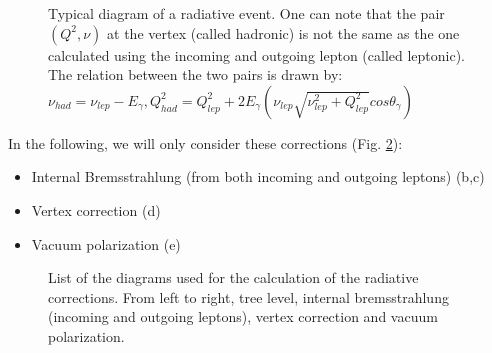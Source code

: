 \begin{figure}[htb]
\centering
{}
\caption{Typical diagram of a radiative event. One can note that the pair $(Q^2,\nu)$ at the vertex (called hadronic) is not the same as the one calculated using the incoming and outgoing lepton (called leptonic). The relation between the two pairs is drawn by: $\nu_{had} = \nu_{lep} - E_\gamma, Q^2_{had}=Q^2_{lep}+2E_\gamma(\nu_{lep} \sqrt{\nu_{lep}^2+Q^2_{lep}}cos\theta_\gamma)$}
\label{fig:rad_evt}
\end{figure}


In the following, we will only consider these corrections (Fig. \ref{fig:rad_dia}):
\begin{itemize}
\item Internal Bremsstrahlung (from both incoming and outgoing leptons) (b,c)
\item Vertex correction (d)
\item Vacuum polarization (e)
\end{itemize}

\begin{figure}[htb]
\centerline{}
\caption{List of the diagrams used for the calculation of the radiative corrections. From left to right, tree level, internal bremsstrahlung (incoming and outgoing leptons), vertex correction and vacuum polarization.}\label{fig:rad_dia}
\end{figure}

